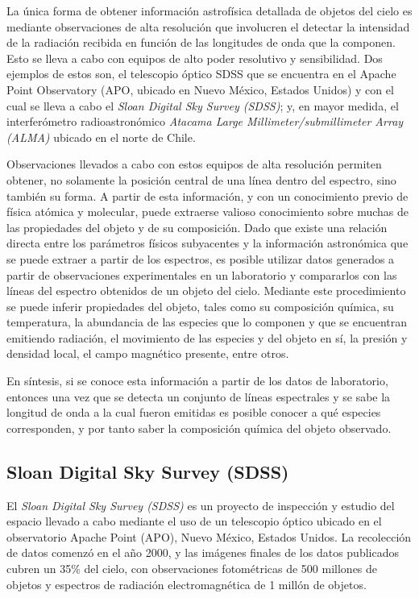 La única forma de obtener información astrofísica detallada de objetos del cielo es mediante observaciones de alta resolución que involucren el detectar la intensidad de la radiación recibida en función de las longitudes de onda que la componen. Esto se lleva a cabo con equipos de alto poder resolutivo y sensibilidad. Dos ejemplos de estos son, el telescopio óptico SDSS que se encuentra en el Apache Point Observatory (APO, ubicado en Nuevo México, Estados Unidos) y con el cual se lleva a cabo el \textit{Sloan Digital Sky Survey (SDSS)}; y, en mayor medida, el interferómetro radioastronómico \textit{Atacama Large Millimeter/submillimeter Array (ALMA)} ubicado en el norte de Chile.

Observaciones llevados a cabo con estos equipos de alta resolución permiten obtener, no solamente la posición central de una línea dentro del espectro, sino también su forma. A partir de esta información, y con un conocimiento previo de física atómica y molecular, puede extraerse valioso conocimiento sobre muchas de las propiedades del objeto y de su composición. Dado que existe una relación directa entre los parámetros físicos subyacentes y la información astronómica que se puede extraer a partir de los espectros, es posible utilizar datos generados a partir de observaciones experimentales en un laboratorio y compararlos con las líneas del espectro obtenidos de un objeto del cielo. Mediante este procedimiento se puede inferir propiedades del objeto, tales como su composición química, su temperatura, la abundancia de las especies que lo componen y que se encuentran emitiendo radiación, el movimiento de las especies y del objeto en sí, la presión y densidad local, el campo magnético presente, entre otros.

En síntesis, si se conoce esta información a partir de los datos de laboratorio, entonces una vez que se detecta un conjunto de líneas espectrales y se sabe la longitud de onda a la cual fueron emitidas es posible conocer a qué especies corresponden, y por tanto saber la composición química del objeto observado.

\subsection{Sloan Digital Sky Survey (SDSS)}

El \textit{Sloan Digital Sky Survey (SDSS)} es un proyecto de inspección y estudio del espacio llevado a cabo mediante el uso de un telescopio óptico ubicado en el observatorio Apache Point (APO), Nuevo México, Estados Unidos. La recolección de datos comenzó en el año 2000, y las imágenes finales de los datos publicados cubren un 35\% del cielo, con observaciones fotométricas de 500 millones de objetos y espectros de radiación electromagnética de 1 millón de objetos.

